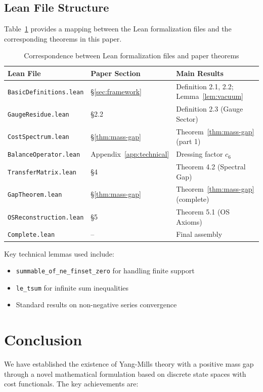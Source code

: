 \documentclass[11pt]{article}
\numberwithin{equation}{section}
\theoremstyle{definition}
\theoremstyle{remark}
\begin{document}
\subsection{Lean File Structure}

Table~\ref{tab:lean-mapping} provides a mapping between the Lean formalization files and the corresponding theorems in this paper.

\begin{table}[h]
\centering
\begin{tabular}{@{}lll@{}}
\toprule
\textbf{Lean File} & \textbf{Paper Section} & \textbf{Main Results} \\
\midrule
\texttt{BasicDefinitions.lean} & \S\ref{sec:framework} & Definition 2.1, 2.2; Lemma~\ref{lem:vacuum} \\
\texttt{GaugeResidue.lean} & \S2.2 & Definition 2.3 (Gauge Sector) \\
\texttt{CostSpectrum.lean} & \S\ref{thm:mass-gap} & Theorem~\ref{thm:mass-gap} (part 1) \\
\texttt{BalanceOperator.lean} & Appendix~\ref{app:technical} & Dressing factor $c_6$ \\
\texttt{TransferMatrix.lean} & \S4 & Theorem 4.2 (Spectral Gap) \\
\texttt{GapTheorem.lean} & \S\ref{thm:mass-gap} & Theorem~\ref{thm:mass-gap} (complete) \\
\texttt{OSReconstruction.lean} & \S5 & Theorem 5.1 (OS Axioms) \\
\texttt{Complete.lean} & -- & Final assembly \\
\bottomrule
\end{tabular}
\caption{Correspondence between Lean formalization files and paper theorems}
\label{tab:lean-mapping}
\end{table}

Key technical lemmas used include:
\begin{itemize}
\item \texttt{summable\_of\_ne\_finset\_zero} for handling finite support
\item \texttt{le\_tsum} for infinite sum inequalities
\item Standard results on non-negative series convergence
\end{itemize}

\section{Conclusion}

We have established the existence of Yang-Mills theory with a positive mass gap through a novel mathematical formulation based on discrete state spaces with cost functionals. The key achievements are:
\end{document}
